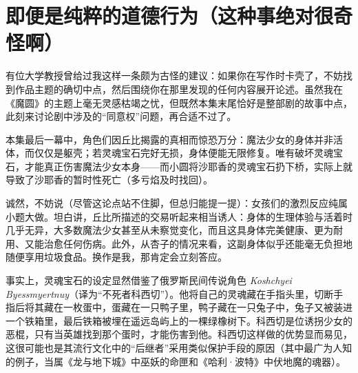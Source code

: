 \chapter[即便是纯粹的道德行为（这种事绝对很奇怪啊）]{即便是纯粹的道德行为\protect\footnotemark（这种事绝对很奇怪啊）}


有位大学教授曾给过我这样一条颇为古怪的建议：如果你在写作时卡壳了，不妨找到作品主题的确切中点，然后围绕你在那里发现的任何内容展开论述。虽然我在《魔圆》的主题上毫无灵感枯竭之忧，但既然本集末尾恰好是整部剧的故事中点，此刻来讨论剧中涉及的“同意权”问题，再合适不过了。
  
本集最后一幕中，角色们因丘比揭露的真相而惊恐万分：魔法少女的身体并非活体，而仅仅是躯壳；若灵魂宝石完好无损，身体便能无限修复。唯有破坏灵魂宝石，才能真正伤害魔法少女本身——而小圆将沙耶香的灵魂宝石扔下桥，实际上就导致了沙耶香的暂时性死亡（多亏焰及时找回）。  

诚然，不妨说（尽管这论点站不住脚，但总归能提一提）：女孩们的激烈反应纯属小题大做。坦白讲，丘比所描述的交易听起来相当诱人：身体的生理体验与活着时几乎无异，大多数魔法少女甚至从未察觉变化，而且这具身体完美健康、更为耐用、又能治愈任何伤病。此外，从杏子的情况来看，这副身体似乎还能毫无负担地随便享用垃圾食品。换作是我，那肯定会立刻答应。

事实上，灵魂宝石的设定显然借鉴了俄罗斯民间传说角色 \emph{Koshchyei Byessmyertnuy}（译为“不死者科西切”）。他将自己的灵魂藏在手指头里，切断手指后将其藏在一枚蛋中，蛋藏在一只鸭子里，鸭子藏在一只兔子中，兔子又被装进一个铁箱里，最后铁箱被埋在遥远岛屿上的一棵绿橡树下。科西切是位诱拐少女的恶棍，只有当英雄找到那个蛋时，才能伤害到他\cite{ref34}。科西切这样做的优势显而易见，这很可能也是其流行文化中的“后继者”采用类似保护手段的原因（其中最广为人知的例子，当属《龙与地下城》\cite{ref35}中巫妖的命匣和《哈利·波特》\cite{ref36}中伏地魔的魂器）。 

